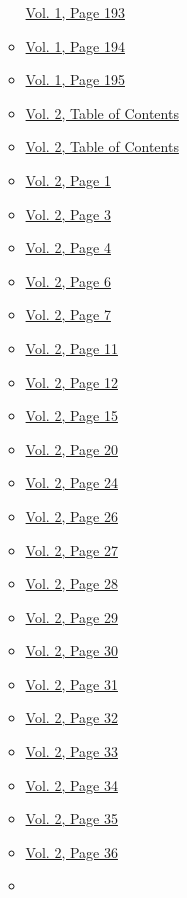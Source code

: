 \begin{itemize}
\begin{itemize}
    \protect\hyperlink{g-page-201}{Vol. 1, Page 193}
  \item
    \protect\hyperlink{g-page-202}{Vol. 1, Page 194}
  \item
    \protect\hyperlink{g-page-203}{Vol. 1, Page 195}
  \item
    \protect\hyperlink{g-page-209}{Vol. 2, Table of Contents}
  \item
    \protect\hyperlink{g-page-210}{Vol. 2, Table of Contents}
  \item
    \protect\hyperlink{g-page-213}{Vol. 2, Page 1}
  \item
    \protect\hyperlink{g-page-215}{Vol. 2, Page 3}
  \item
    \protect\hyperlink{g-page-216}{Vol. 2, Page 4}
  \item
    \protect\hyperlink{g-page-218}{Vol. 2, Page 6}
  \item
    \protect\hyperlink{g-page-219}{Vol. 2, Page 7}
  \item
    \protect\hyperlink{g-page-223}{Vol. 2, Page 11}
  \item
    \protect\hyperlink{g-page-224}{Vol. 2, Page 12}
  \item
    \protect\hyperlink{g-page-227}{Vol. 2, Page 15}
  \item
    \protect\hyperlink{g-page-232}{Vol. 2, Page 20}
  \item
    \protect\hyperlink{g-page-236}{Vol. 2, Page 24}
  \item
    \protect\hyperlink{g-page-238}{Vol. 2, Page 26}
  \item
    \protect\hyperlink{g-page-239}{Vol. 2, Page 27}
  \item
    \protect\hyperlink{g-page-240}{Vol. 2, Page 28}
  \item
    \protect\hyperlink{g-page-241}{Vol. 2, Page 29}
  \item
    \protect\hyperlink{g-page-242}{Vol. 2, Page 30}
  \item
    \protect\hyperlink{g-page-243}{Vol. 2, Page 31}
  \item
    \protect\hyperlink{g-page-244}{Vol. 2, Page 32}
  \item
    \protect\hyperlink{g-page-245}{Vol. 2, Page 33}
  \item
    \protect\hyperlink{g-page-246}{Vol. 2, Page 34}
  \item
    \protect\hyperlink{g-page-247}{Vol. 2, Page 35}
  \item
    \protect\hyperlink{g-page-248}{Vol. 2, Page 36}
  \item

\end{itemize}
\end{itemize}
